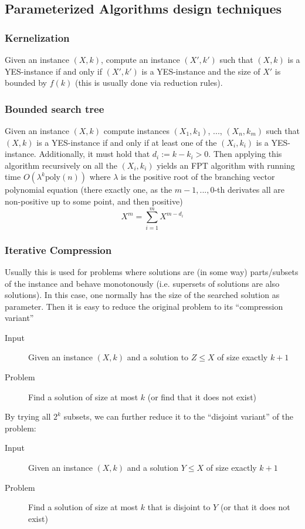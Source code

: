\documentclass{scrartcl}
\begin{document}
\subsection{Parameterized Algorithms design techniques}

\subsubsection*{Kernelization}

Given an instance $(X, k)$, compute an instance $(X', k')$ such that $(X, k)$ is a YES-instance if and only if $(X', k')$ is a YES-instance and the size of $X'$ is bounded by $f(k)$ (this is usually done via reduction rules).

\subsubsection*{Bounded search tree}

Given an instance $(X, k)$ compute instances $(X_1, k_1)$, ..., $(X_n, k_m)$ such that $(X, k)$ is a YES-instance if and only if at least one of the $(X_i, k_i)$ is a YES-instance. Additionally, it must hold that $d_i := k - k_i > 0$.
Then applying this algorithm recursively on all the $(X_i, k_i)$ yields an FPT algorithm with running time $O(\lambda^k \mathrm{poly}(n))$ where $\lambda$ is the positive root of the branching vector polynomial equation (there exactly one, as the $m-1, ..., 0$-th derivates all are non-positive up to some point, and then positive)
\begin{equation*}
    X^m = \sum_{i = 1}^m X^{m - d_i}
\end{equation*}

\subsubsection*{Iterative Compression}

Usually this is used for problems where solutions are (in some way) parts/subsets of the instance and behave monotonously (i.e. supersets of solutions are also solutions).
In this case, one normally has the size of the searched solution as parameter.
Then it is easy to reduce the original problem to its ``compression variant''
\begin{description}
    \item[Input] Given an instance $(X, k)$ and a solution to $Z \leq X$ of size exactly $k + 1$
    \item[Problem] Find a solution of size at most $k$ (or find that it does not exist)
\end{description}
By trying all $2^k$ subsets, we can further reduce it to the ``disjoint variant'' of the problem:
\begin{description}
    \item[Input] Given an instance $(X, k)$ and a solution $Y \leq X$ of size exactly $k + 1$
    \item[Problem] Find a solution of size at most $k$ that is disjoint to $Y$ (or that it does not exist) 
\end{description}
\end{document}
